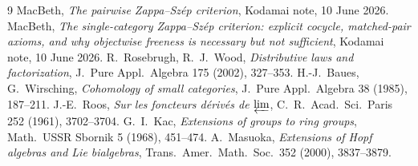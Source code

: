\documentclass[11pt]{article}
\theoremstyle{definition}
\newcommand{\1}{\mathbf{1}}
\begin{document}
\begin{thebibliography}{9}
 MacBeth, \emph{The pairwise Zappa--Sz\'ep criterion}, Kodamai
note, 10 June 2026.
 MacBeth, \emph{The single-category Zappa--Sz\'ep criterion:
explicit cocycle, matched-pair axioms, and why objectwise freeness is necessary but
not sufficient}, Kodamai note, 10 June 2026.
 R.~Rosebrugh, R.~J.~Wood, \emph{Distributive laws and factorization},
J.\ Pure Appl.\ Algebra 175 (2002), 327--353.
 H.-J.~Baues, G.~Wirsching, \emph{Cohomology of small
categories}, J.\ Pure Appl.\ Algebra 38 (1985), 187--211.
 J.-E.~Roos, \emph{Sur les foncteurs d\'eriv\'es de $\varprojlim$},
C.\ R.\ Acad.\ Sci.\ Paris 252 (1961), 3702--3704.
 G.~I.~Kac, \emph{Extensions of groups to ring groups}, Math.\ USSR
Sbornik 5 (1968), 451--474.
 A.~Masuoka, \emph{Extensions of Hopf algebras and Lie bialgebras},
Trans.\ Amer.\ Math.\ Soc.\ 352 (2000), 3837--3879.
\end{thebibliography}
\end{document}
